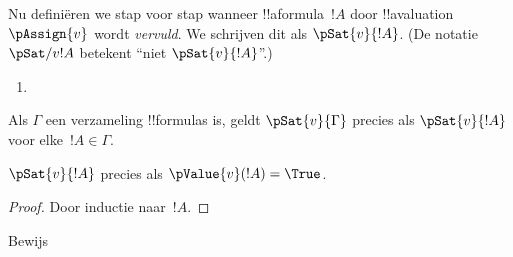\documentclass[openany]{memoir}
\begin{document}
\begin{defn}[Vervulling]
 Nu definiëren we stap voor stap wanneer
  !!a{formula}~$!A$ door !!a{valuation}~$\pAssign{v}$ wordt \emph{vervuld}. We
  schrijven dit als $\pSat{v}{!A}$. (De notatie $\pSat/{v}{!A}$
  betekent ``niet $\pSat{v}{!A}$''.)
\begin{enumerate}


\item {}





\end{enumerate}
Als $\Gamma$ een verzameling !!{formula}s is, geldt
$\pSat{v}{\Gamma}$ precies als $\pSat{v}{!A}$ voor
elke~$!A \in \Gamma$.
\end{defn}

\begin{prop}
  $\pSat{v}{!A}$ precies als $\pValue{v}(!A) = \True$.
\end{prop}

\begin{proof}
  Door inductie naar~$!A$.
\end{proof}

\begin{prob}
  Bewijs 
\end{prob}
\endgroup

\begingroup
\def\olfilename{OLP-0062}
\def\olfilepath{content/propositional-logic/syntax-and-semantics/}
\hypertarget{unit-OLP-0062}{}
\end{document}
